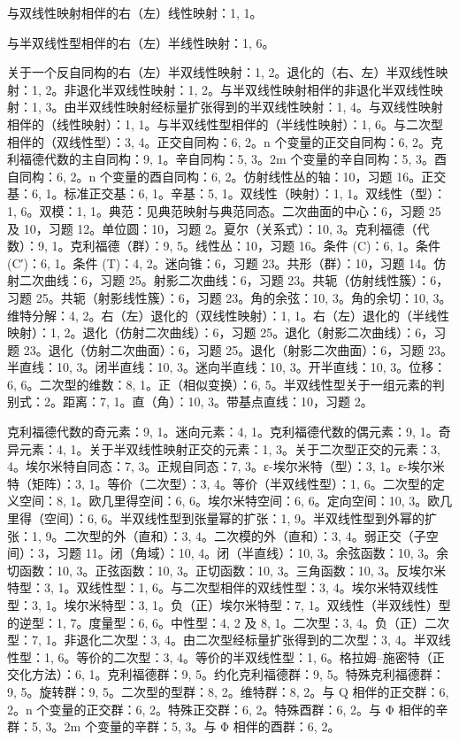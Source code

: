与双线性映射相伴的右（左）线性映射：1, 1。

与半双线性型相伴的右（左）半线性映射：1, 6。

关于一个反自同构的右（左）半双线性映射：1, 2。退化的（右、左）半双线性映射：1, 2。非退化半双线性映射：1, 2。与半双线性映射相伴的非退化半双线性映射：1, 3。由半双线性映射经标量扩张得到的半双线性映射：1, 4。与双线性映射相伴的（线性映射）：1, 1。与半双线性型相伴的（半线性映射）：1, 6。与二次型相伴的（双线性型）：3, 4。正交自同构：6, 2。n 个变量的正交自同构：6, 2。克利福德代数的主自同构：9, 1。辛自同构：5, 3。2m 个变量的辛自同构：5, 3。酉自同构：6, 2。n 个变量的酉自同构：6, 2。仿射线性丛的轴：10，习题 16。正交基：6, 1。标准正交基：6, 1。辛基：5, 1。双线性（映射）：1, 1。双线性（型）：1, 6。双模：1, 1。典范：见典范映射与典范同态。二次曲面的中心：6，习题 25 及 10，习题 12。单位圆：10，习题 2。夏尔（关系式）：10, 3。克利福德（代数）：9, 1。克利福德（群）：9, 5。线性丛：10，习题 16。条件 (C)：6, 1。条件 (C′)：6, 1。条件 (T)：4, 2。迷向锥：6，习题 23。共形（群）：10，习题 14。仿射二次曲线：6，习题 25。射影二次曲线：6，习题 23。共轭（仿射线性簇）：6，习题 25。共轭（射影线性簇）：6，习题 23。角的余弦：10, 3。角的余切：10, 3。维特分解：4, 2。右（左）退化的（双线性映射）：1, 1。右（左）退化的（半线性映射）：1, 2。退化（仿射二次曲线）：6，习题 25。退化（射影二次曲线）：6，习题 23。退化（仿射二次曲面）：6，习题 25。退化（射影二次曲面）：6，习题 23。半直线：10, 3。闭半直线：10, 3。迷向半直线：10, 3。开半直线：10, 3。位移：6, 6。二次型的维数：8, 1。正（相似变换）：6, 5。半双线性型关于一组元素的判别式：2。距离：7, 1。直（角）：10, 3。带基点直线：10，习题 2。

克利福德代数的奇元素：9, 1。迷向元素：4, 1。克利福德代数的偶元素：9, 1。奇异元素：4, 1。关于半双线性映射正交的元素：1, 3。关于二次型正交的元素：3, 4。埃尔米特自同态：7, 3。正规自同态：7, 3。ε-埃尔米特（型）：3, 1。ε-埃尔米特（矩阵）：3, 1。等价（二次型）：3, 4。等价（半双线性型）：1, 6。二次型的定义空间：8, 1。欧几里得空间：6, 6。埃尔米特空间：6, 6。定向空间：10, 3。欧几里得（空间）：6, 6。半双线性型到张量幂的扩张：1, 9。半双线性型到外幂的扩张：1, 9。二次型的外（直和）：3, 4。二次模的外（直和）：3, 4。弱正交（子空间）：3，习题 11。闭（角域）：10, 4。闭（半直线）：10, 3。余弦函数：10, 3。余切函数：10, 3。正弦函数：10, 3。正切函数：10, 3。三角函数：10, 3。反埃尔米特型：3, 1。双线性型：1, 6。与二次型相伴的双线性型：3, 4。埃尔米特双线性型：3, 1。埃尔米特型：3, 1。负（正）埃尔米特型：7, 1。双线性（半双线性）型的逆型：1, 7。度量型：6, 6。中性型：4, 2 及 8, 1。二次型：3, 4。负（正）二次型：7, 1。非退化二次型：3, 4。由二次型经标量扩张得到的二次型：3, 4。半双线性型：1, 6。等价的二次型：3, 4。等价的半双线性型：1, 6。格拉姆–施密特（正交化方法）：6, 1。克利福德群：9, 5。约化克利福德群：9, 5。特殊克利福德群：9, 5。旋转群：9, 5。二次型的型群：8, 2。维特群：8, 2。与 Q 相伴的正交群：6, 2。n 个变量的正交群：6, 2。特殊正交群：6, 2。特殊酉群：6, 2。与 Φ 相伴的辛群：5, 3。2m 个变量的辛群：5, 3。与 Φ 相伴的酉群：6, 2。


